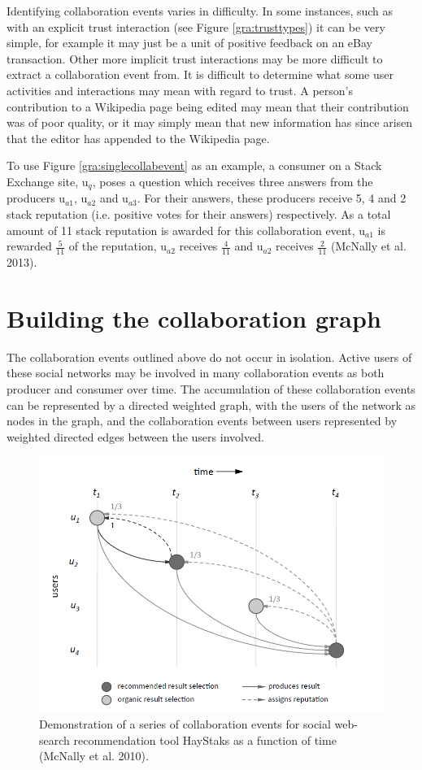 \documentclass[]{final_report}
\begin{document}
Identifying collaboration events varies in difficulty. In some instances, such as with an explicit trust interaction (see Figure \ref{gra:trusttypes}) it can be very simple, for example it may just be a unit of positive feedback on an eBay transaction. Other more implicit trust interactions may be more difficult to extract a collaboration event from. It is difficult to determine what some user activities and interactions may mean with regard to trust. A person's contribution to a Wikipedia page being edited may mean that their contribution was of poor quality, or it may simply mean that new information has since arisen that the editor has appended to the Wikipedia page.

To use Figure \ref{gra:singlecollabevent} as an example, a consumer on a Stack Exchange site, u$_{q}$, poses a question which receives three answers from the producers u$_{a1}$, u$_{a2}$ and u$_{a3}$. For their answers, these producers receive 5, 4 and 2 stack reputation (i.e. positive votes for their answers) respectively. As a total amount of 11 stack reputation is awarded for this collaboration event, u$_{a1}$ is rewarded $\frac{5}{11}$ of the reputation, u$_{a2}$ receives $\frac{4}{11}$ and u$_{a2}$ receives $\frac{2}{11}$ (McNally et al. 2013).

\section{Building the collaboration graph}

The collaboration events outlined above do not occur in isolation. Active users of these social networks may be involved in many collaboration events as both producer and consumer over time. The accumulation of these collaboration events can be represented by a directed weighted graph, with the users of the network as nodes in the graph, and the collaboration events between users represented by weighted directed edges between the users involved.

\begin{figure}[ht!]
\centering
\includegraphics[width=130mm]{chap3/collabeventstime.PNG}
\caption{Demonstration of a series of collaboration events for social web-search recommendation tool HayStaks as a function of time (McNally et al. 2010).}
\end{figure}\label{gra:collabtime}
\end{document}
